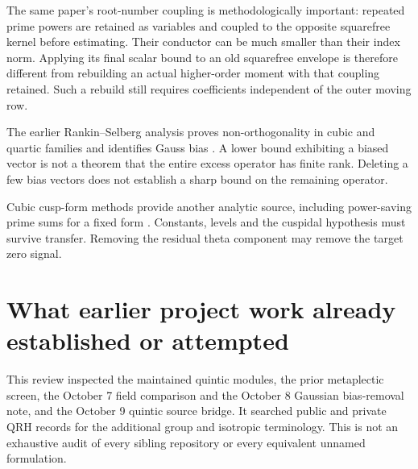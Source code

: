 \documentclass[11pt]{article}
\begin{document}
The same paper's root-number coupling is methodologically important:
repeated prime powers are retained as variables and coupled to the
opposite squarefree kernel before estimating. Their conductor can be
much smaller than their index norm. Applying its final scalar bound to
an old squarefree envelope is therefore different from rebuilding an
actual higher-order moment with that coupling retained. Such a rebuild
still requires coefficients independent of the outer moving row.

The earlier Rankin--Selberg analysis proves non-orthogonality in cubic
and quartic families and identifies Gauss bias \cite{FDDH}.
A lower bound exhibiting a biased vector is not a theorem that the
entire excess operator has finite rank. Deleting a few bias vectors
does not establish a sharp bound on the remaining operator.

Cubic cusp-form methods provide another analytic source, including
power-saving prime sums for a fixed form \cite{DunnCusp}. Constants,
levels and the cuspidal hypothesis must survive transfer. Removing the
residual theta component may remove the target zero signal.

\section{What earlier project work already established or attempted}

This review inspected the maintained quintic modules, the prior
metaplectic screen, the October 7 field comparison and the October 8
Gaussian bias-removal note, and the October 9 quintic source bridge.
It searched public and private QRH records for the additional group
and isotropic terminology. This is not an exhaustive audit of every
sibling repository or every equivalent unnamed formulation.
\end{document}
